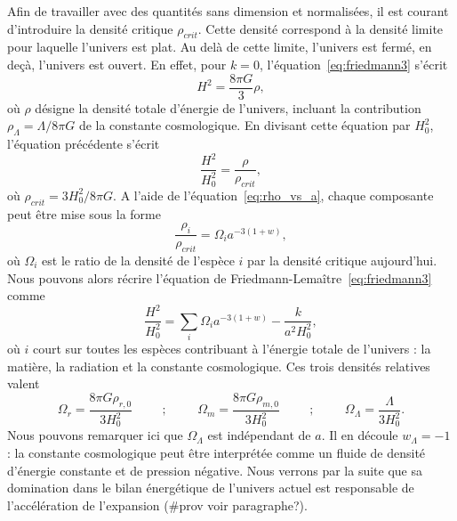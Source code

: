 \documentclass[11pt, twoside, a4paper, openright]{report}
\begin{document}
Afin de travailler avec des quantités sans dimension et normalisées, il est courant d'introduire la densité critique $\rho_{crit}$. Cette densité correspond à la densité limite pour laquelle l'univers est plat. Au delà de cette limite, l'univers est fermé, en deçà, l'univers est ouvert. En effet, pour $k = 0$, l'équation~\ref{eq:friedmann3} s'écrit
\begin{equation}
  H^{2} = \frac{8 \pi G }{3} \rho ,
\end{equation}
où $\rho$ désigne la densité totale d'énergie de l'univers, incluant la contribution $\rho_{\Lambda} = \Lambda / 8 \pi G$ de la constante cosmologique. En divisant cette équation par $H_{0}^{2}$, l'équation précédente s'écrit
\begin{equation}
  \label{eq:friedmann5}
  \frac{H^2}{H_0^2} = \frac{\rho}{\rho_{crit}} ,
\end{equation}
où $\rho_{crit} = 3 H_0^2 / 8 \pi G$. A l'aide de l'équation~\ref{eq:rho_vs_a}, chaque composante peut être mise sous la forme
\begin{equation}
  \label{eq:def_omgega}
  \frac{\rho_i}{\rho_{crit}} = \Omega_i a^{-3 (1+w)} , 
\end{equation}
où $\Omega_i$ est le ratio de la densité de l'espèce $i$ par la densité critique aujourd'hui. Nous pouvons alors récrire l'équation de Friedmann-Lemaître~\ref{eq:friedmann3} comme
\begin{equation}
  \label{eq:friedmann6}
  \frac{H^2}{H_0^2} = \sum_i \Omega_i a^{-3 (1+w)} - \frac{k}{a^{2} H_{0}^{2}},
\end{equation}
où $i$ court sur toutes les espèces contribuant à l'énergie totale de l'univers : la matière, la radiation et la constante cosmologique. Ces trois densités relatives valent
\begin{equation}
  \label{eq:def_omega2}
\Omega_{r} = \frac{8 \pi G \rho_{r, 0}}{3 H_{0}^{2}} \hspace{1cm} ; \hspace{1cm} \Omega_{m} = \frac{8 \pi G \rho_{m, 0}}{3 H_{0}^{2}} \hspace{1cm} ;\hspace{1cm} \Omega_{\Lambda} = \frac{\Lambda}{3 H_{0}^{2}} .
\end{equation}
Nous pouvons remarquer ici que $\Omega_{\Lambda}$ est indépendant de $a$. Il en découle $w_{\Lambda} = -1$ : la constante cosmologique peut être interprétée comme un fluide de densité d'énergie constante et de pression négative. Nous verrons par la suite que sa domination dans le bilan énergétique de l'univers actuel est responsable de l'accélération de l'expansion (\#prov voir paragraphe?).
\end{document}
